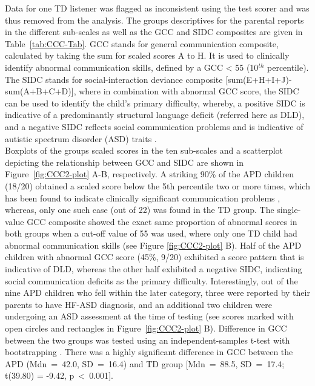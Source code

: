 \documentclass[a4paper, twoside]{templates/ociamthesis}
\begin{document}
Data for one TD listener was flagged as inconsistent using the test scorer and was thus removed from the analysis. The groups descriptives for the parental reports in the different sub-scales as well as the GCC and SIDC composites are given in Table~\ref{tab:CCC-Tab}. GCC stands for general communication composite, calculated by taking the sum for scaled scores A to H. It is used to clinically identify abnormal communication skills, defined by a GCC \textless{} 55 (10\(^{th}\) percentile). The SIDC stands for social-interaction deviance composite {[}sum(E+H+I+J)-sum(A+B+C+D){]}, where in combination with abnormal GCC score, the SIDC can be used to identify the child's primary difficulty, whereby, a positive SIDC is indicative of a predominantly structural language deficit (referred here as DLD), and a negative SIDC reflects social communication problems and is indicative of autistic spectrum disorder (ASD) traits \autocite{Norbury2014,Bishop2003}.\\

Boxplots of the groups scaled scores in the ten sub-scales and a scatterplot depicting the relationship between GCC and SIDC are shown in Figure~\ref{fig:CCC2-plot} A-B, respectively. A striking 90\% of the APD children (18/20) obtained a scaled score below the 5th percentile two or more times, which has been found to indicate clinically significant communication problems \autocite{Bishop2003}, whereas, only one such case (out of 22) was found in the TD group. The single-value GCC composite showed the exact same proportion of abnormal scores in both groups when a cut-off value of 55 was used, where only one TD child had abnormal communication skills (see Figure \ref{fig:CCC2-plot} B). Half of the APD children with abnormal GCC score (45\%, 9/20) exhibited a score pattern that is indicative of DLD, whereas the other half exhibited a negative SIDC, indicating social communication deficits as the primary difficulty. Interestingly, out of the nine APD children who fell within the later category, three were reported by their parents to have HF-ASD diagnosis, and an additional two children were undergoing an ASD assessment at the time of testing (see scores marked with open circles and rectangles in Figure~\ref{fig:CCC2-plot} B). Difference in GCC between the two groups was tested using an independent-samples t-test with bootstrapping \autocite[\emph{MKinfer::boot.t.test()}, n=9999;][]{MKinferPackageR}. There was a highly significant difference in GCC between the APD (Mdn~=~42.0, SD~=~16.4) and TD group {[}Mdn~=~88.5, SD~=~17.4; t(39.80) = -9.42, p~\textless~0.001{]}.\\
\end{document}
